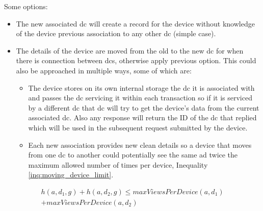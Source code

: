 Some options:
\begin{itemize}
	\item The new associated \gls{dc} will create a record for the device without knowledge of the device previous association to any other \gls{dc} (simple case).
	
	\item The details of the device are moved from the old to the new \gls{dc} for when there is connection between \glspl{dc}, otherwise apply previous option. This could also be approached in multiple ways, some of which are:
	\begin{itemize}
	 	\item  The device stores on its own internal storage the \gls{dc} it is associated with and passes the \gls{dc} servicing it within each transaction so if it is serviced by a different \gls{dc} that \gls{dc} will try to get the device's data from the current associated \gls{dc}. Also any response will return the ID of the \gls{dc} that replied which will be used in the subsequent request submitted by the device.
	 	
	 	\item Each new association provides new clean details so a device that moves from one \gls{dc} to another could potentially see the same ad twice the maximum allowed number of times per device, Inequality \ref{inq:moving_device_limit}.
	\end{itemize}
\end{itemize}

\begin{multline}
h(a, d_{1}, g) + h(a, d_{2}, g) \le maxViewsPerDevice(a, d_{1}) \\+ maxViewsPerDevice(a, d_{2})
\label{inq:moving_device_limit}
\end{multline}
